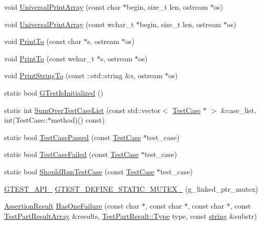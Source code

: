 \begin{DoxyCompactItemize}
\item 
void \hyperlink{namespacetesting_1_1internal_a070107e7a8205ad6ec4d538d52b15b38}{Universal\+Print\+Array} (const char $\ast$begin, size\+\_\+t len, ostream $\ast$os)
\item 
void \hyperlink{namespacetesting_1_1internal_a52394019018eb5079f9f1bcca23dcd60}{Universal\+Print\+Array} (const wchar\+\_\+t $\ast$begin, size\+\_\+t len, ostream $\ast$os)
\item 
void \hyperlink{namespacetesting_1_1internal_adc6c98306d40b53fd07be4e295102a0a}{Print\+To} (const char $\ast$s, ostream $\ast$os)
\item 
void \hyperlink{namespacetesting_1_1internal_afc20fb56b2547a8f91f9ff99650f2024}{Print\+To} (const wchar\+\_\+t $\ast$s, ostream $\ast$os)
\item 
void \hyperlink{namespacetesting_1_1internal_ad609167d8d6792b0fb186539e0e159bd}{Print\+String\+To} (const \+::std\+::string \&s, ostream $\ast$os)
\item 
static bool \hyperlink{namespacetesting_1_1internal_a91e707e0d371fae0224ffd37f0d042af}{G\+Test\+Is\+Initialized} ()
\item 
static int \hyperlink{namespacetesting_1_1internal_ad1b758141e7e064d00a2bf0355c8ee43}{Sum\+Over\+Test\+Case\+List} (const std\+::vector$<$ \hyperlink{classtesting_1_1TestCase}{Test\+Case} $\ast$ $>$ \&case\+\_\+list, int(Test\+Case\+::$\ast$method)() const)
\item 
static bool \hyperlink{namespacetesting_1_1internal_aadc7afca7aab40f7f1d41bc17974459a}{Test\+Case\+Passed} (const \hyperlink{classtesting_1_1TestCase}{Test\+Case} $\ast$test\+\_\+case)
\item 
static bool \hyperlink{namespacetesting_1_1internal_a53454b6089c1c5b25319caa9de6c5c02}{Test\+Case\+Failed} (const \hyperlink{classtesting_1_1TestCase}{Test\+Case} $\ast$test\+\_\+case)
\item 
static bool \hyperlink{namespacetesting_1_1internal_a73e562dfef3eb7b30dfbb7b5e88e6df2}{Should\+Run\+Test\+Case} (const \hyperlink{classtesting_1_1TestCase}{Test\+Case} $\ast$test\+\_\+case)
\item 
\hyperlink{gtest-port_8h_aa73be6f0ba4a7456180a94904ce17790}{G\+T\+E\+S\+T\+\_\+\+A\+P\+I\+\_\+} \hyperlink{namespacetesting_1_1internal_aff419d76acc3727be48d195f927189c9}{G\+T\+E\+S\+T\+\_\+\+D\+E\+F\+I\+N\+E\+\_\+\+S\+T\+A\+T\+I\+C\+\_\+\+M\+U\+T\+E\+X\+\_\+} (g\+\_\+linked\+\_\+ptr\+\_\+mutex)
\item 
\hyperlink{classtesting_1_1AssertionResult}{Assertion\+Result} \hyperlink{namespacetesting_1_1internal_a14ff02e6d151f45e998657674e9af88a}{Has\+One\+Failure} (const char $\ast$, const char $\ast$, const char $\ast$, const \hyperlink{classtesting_1_1TestPartResultArray}{Test\+Part\+Result\+Array} \&results, \hyperlink{classtesting_1_1TestPartResult_a65ae656b33fdfdfffaf34858778a52d5}{Test\+Part\+Result\+::\+Type} type, const \hyperlink{namespacetesting_1_1internal_a8e8ff5b11e64078831112677156cb111}{string} \&substr)

\end{DoxyCompactItemize}
